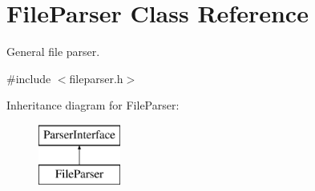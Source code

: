 \hypertarget{class_file_parser}{}\section{File\+Parser Class Reference}
\label{class_file_parser}


General file parser.  




{\ttfamily \#include $<$fileparser.\+h$>$}

Inheritance diagram for File\+Parser\+:\begin{figure}[H]
\begin{center}
\leavevmode
\includegraphics[height=2.000000cm]{class_file_parser}
\end{center}
\end{figure}
